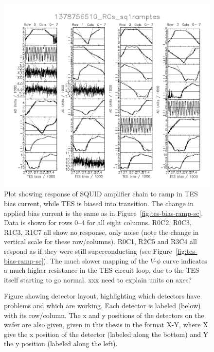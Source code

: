 \documentclass[10pt,twocolumn,article]{memoir}
\newcommand*{\figref}[1]{Figure~\ref{#1}}
\newcommand*{\TES}{{\small TES}\xspace}
\newcommand*{\RC}[2]{R{#1}C{#2}\xspace}
\begin{document}
\begin{figure}[th]
\centering
\includegraphics[width=\textwidth]{images/1378756510_RCs_sq1ramptes_00.png}
\caption{Plot showing response of SQUID amplifier chain to ramp in \TES bias current, while \TES is biased into transition. The change in applied bias current is the same as in \figref{fig:tes-bias-ramp-sc}.
Data is shown for rows 0--4 for all eight columns.
\RC{0}{2}, \RC{0}{3}, \RC{1}{3}, \RC{1}{7} all show no response, only noise (note the change in vertical scale for these row/columns).
\RC{0}{1}, \RC{2}{5} and \RC{3}{4} all respond as if they were still superconducting (see \figref{fig:tes-bias-ramp-sc}).
The much slower mapping of the $V$-$\phi$ curve indicates a much higher resistance in the \TES circuit loop, due to the \TES itself starting to go normal.
xxx need to explain units on axes?}
\label{fig:tes-bias-ramp-trans}
\end{figure}

\begin{figure}
\centering

\caption{
Figure showing detector layout, highlighting which detectors have problems and which are working.
Each detector is labeled (below) with its row/column.
The x and y positions of the detectors on the wafer are also given, given in this thesis in the format X-Y, where X give the x position of the detector (labeled along the bottom) and Y the y position (labeled along the left).
}
\label{fig:detector-cuts-wafer}
\end{figure}
\end{document}
